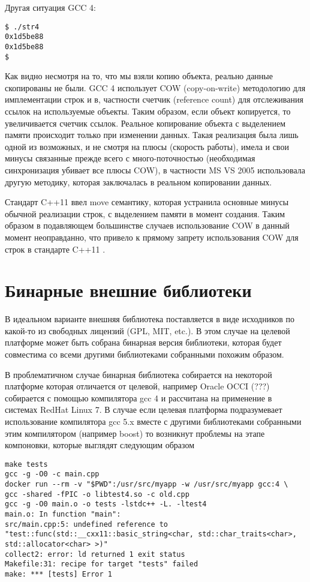 \documentclass[14pt,a4paper]{article}
\begin{document}
Другая ситуация GCC 4:
\begin{verbatim}
$ ./str4
0x1d5be88
0x1d5be88
$
\end{verbatim}

Как видно несмотря на то, что мы взяли копию объекта, реально данные
скопированы не были. GCC 4 использует COW (copy-on-write) методологию
для имплементации строк и в, частности счетчик (reference count) для
отслеживания ссылок на используемые объекты. Таким образом, если объект
копируется, то увеличивается счетчик ссылок. Реальное копирование
объекта с выделением памяти происходит только при изменении данных.
Такая реализация была 
лишь одной из возможных, и не смотря на плюсы (скорость работы), имела
и свои минусы связанные прежде всего с много-поточностью (необходимая
синхронизация убивает все плюсы COW), в частности MS VS 2005
использовала другую методику, которая заключалась в реальном
копировании данных. 

Стандарт C++11 ввел move семантику, которая устранила основные
минусы обычной реализации строк, с выделением памяти в момент
создания. Таким образом в подавляющем большинстве случаев
использование COW в данный момент неоправданно, что привело к прямому
запрету использования COW для строк в стандарте C++11
\cite{ISO:2012:III}. 

\section{Бинарные внешние библиотеки}

В идеальном варианте внешняя библиотека поставляется в виде исходников
по какой-то из свободных лицензий (GPL, MIT, etc.). В этом случае на
целевой платформе может быть собрана бинарная версия библиотеки,
которая будет совместима со всеми другими библиотеками собранными
похожим образом. 

В проблематичном случае бинарная библиотека собирается на некоторой
платформе которая отличается от целевой, например Oracle OCCI (???)
собирается с помощью компилятора gcc 4 и рассчитана на применение в
системах RedHat Linux 7. В случае если целевая платформа подразумевает
использование компилятора gcc 5.x вместе с другими библиотеками
собранными этим компилятором (например boost) то возникнут проблемы
на этапе компоновки, которые выглядят следующим образом

\begin{verbatim}
make tests
gcc -g -O0 -c main.cpp 
docker run --rm -v "$PWD":/usr/src/myapp -w /usr/src/myapp gcc:4 \
gcc -shared -fPIC -o libtest4.so -c old.cpp
gcc -g -O0 main.o -o tests -lstdc++ -L. -ltest4
main.o: In function "main":
src/main.cpp:5: undefined reference to 
"test::func(std::__cxx11::basic_string<char, std::char_traits<char>, 
std::allocator<char> >)"
collect2: error: ld returned 1 exit status
Makefile:31: recipe for target "tests" failed
make: *** [tests] Error 1
\end{verbatim}
\end{document}
